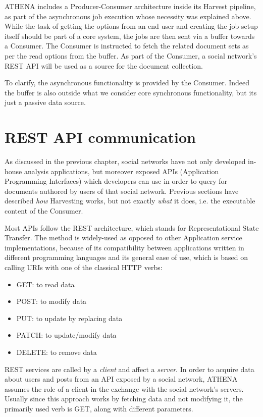 ATHENA includes a Producer-Consumer architecture inside its Harvest pipeline, as part of the asynchronous job execution whose necessity was explained above. While the task of getting the options from an end user and creating the job setup itself should be part of a core system, the jobs are then sent via a buffer towards a Consumer. The Consumer is instructed to fetch the related document sets as per the read options from the buffer. As part of the Consumer, a social network's REST API will be used as a source for the document collection.

To clarify, the asynchronous functionality is provided by the Consumer. Indeed the buffer is also outside what we consider core synchronous functionality, but its just a passive data source.

\section{REST API communication}
As discussed in the previous chapter, social networks have not only developed in-house analysis applications, but moreover exposed APIs (Application Programming Interfaces) which developers can use in order to query for documents authored by users of that social network. Previous sections have described \emph{how} Harvesting works, but not exactly \emph{what} it does, i.e. the executable content of the Consumer.

Most APIs follow the REST architecture, which stands for Representational State Transfer. The method is widely-used as opposed to other Application service implementations, because of its compatibility between applications written in different programming languages and its general ease of use, which is based on calling URIs with one of the classical HTTP verbs:

\begin{itemize}
\item GET: to read data
\item POST: to modify data
\item PUT: to update by replacing data
\item PATCH: to update/modify data
\item DELETE: to remove data
\end{itemize}

REST services are called by a \emph{client} and affect a \emph{server}. In order to acquire data about users and posts from an API exposed by a social network, ATHENA assumes the role of a client in the exchange with the social network's servers. Usually since this approach works by fetching data and not modifying it, the primarily used verb is GET, along with different parameters.

